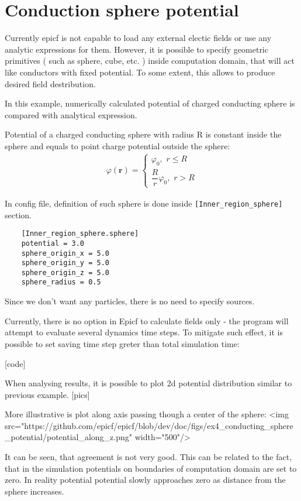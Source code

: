 \message{ !name(ef.tex)}\documentclass[12pt,a4paper]{article}
\title{}
\numberwithin{equation}{section}
\begin{document}
\section{Conduction sphere potential}
Currently epicf is not capable to load any external electic fields or
use any analytic expressions for them.  However, it is possible to
specify geometric primitives ( such as sphere, cube, etc. ) inside
computation domain, that will act like conductors with fixed
potential. To some extent, this allows to produce desired field
destribution.

In this example, numerically calculated potential of charged
conducting sphere is compared with analytical expression.

Potential of a charged conducting sphere with radius R is constant
inside the sphere and equals to point charge potential outside the
sphere:
\begin{gather}
  \varphi( \mathbf{r} )
  = 
  \begin{cases}
    \varphi_0, \,\, r \le R \\
    \dfrac{R}{r} \varphi_0, \,\, r > R
  \end{cases}
\end{gather}

In config file, definition of such sphere is done inside
\texttt{[Inner_region_sphere]} section.

\begin{verbatim}
    [Inner_region_sphere.sphere]
    potential = 3.0
    sphere_origin_x = 5.0
    sphere_origin_y = 5.0
    sphere_origin_z = 5.0
    sphere_radius = 0.5
\end{verbatim}

Since we don't want any particles, there is no need to specify sources. 

Currently, there is no option in Epicf to calculate fields only - the program will attempt to evaluate several dynamics time steps. To mitigate such effect, it is possible to set saving time step greter than total simulation time:

[code]

When analysing results, it is possible to plot 2d potential distribution similar to previous example.
[pics]

More illustrative is plot along axis passing though a center of the sphere:
<img src="https://github.com/epicf/epicf/blob/dev/doc/figs/ex4_conducting_sphere_potential/potential_along_z.png" width="500"/>

It can be seen, that agreement is not very good. This can be related to the fact, that 
in the simulation potentials on boundaries of computation domain are
set to zero. In reality potential potential slowly approaches zero as
distance from the sphere increases.  


\end{document}
